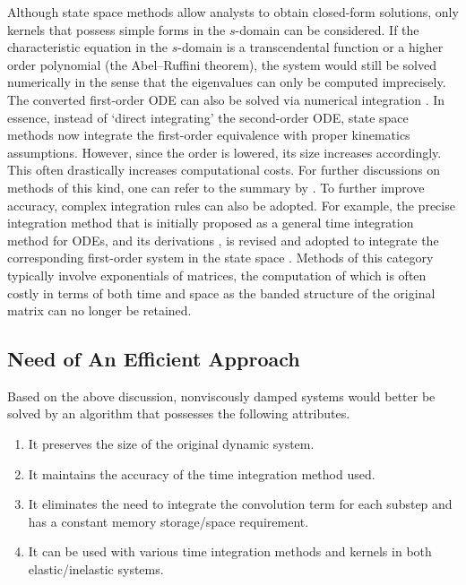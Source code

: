 Although state space methods allow analysts to obtain closed-form solutions, only kernels that possess simple forms in the $s$-domain can be considered. If the characteristic equation in the $s$-domain is a transcendental function or a higher order polynomial (the Abel--Ruffini theorem), the system would still be solved numerically in the sense that the eigenvalues can only be computed imprecisely. The converted first-order ODE can also be solved via numerical integration \citep{Adhikari2004,Ding2016}.
In essence, instead of `direct integrating' the second-order ODE, state space methods now integrate the first-order equivalence with proper kinematics assumptions.
However, since the order is lowered, its size increases accordingly. This often drastically increases computational costs. For further discussions on methods of this kind, one can refer to the summary by \citet[][\S~1.3.1]{Adhikari2014}.
To further improve accuracy, complex integration rules can also be adopted. For example, the precise integration method \citep{Zhong1994} that is initially proposed as a general time integration method for ODEs, and its derivations \citep[e.g.,][]{Wang2008}, is revised and adopted to integrate the corresponding first-order system in the state space \citep[see, e.g.,][]{Wang2018,Ding2018,Abbasi2019,Abbasi2022}.
Methods of this category typically involve exponentials of matrices, the computation of which is often costly in terms of both time and space as the banded structure of the original matrix can no longer be retained.
\subsection{Need of An Efficient Approach}
Based on the above discussion, nonviscously damped systems would better be solved by an algorithm that possesses the following attributes.
\begin{Objective}
\begin{enumerate}
\item It preserves the size of the original dynamic system.
\item It maintains the accuracy of the time integration method used.
\item It eliminates the need to integrate the convolution term for each substep and has a constant memory storage/space requirement.
\item It can be used with various time integration methods and kernels in both elastic/inelastic systems.
\end{enumerate}
\end{Objective}

